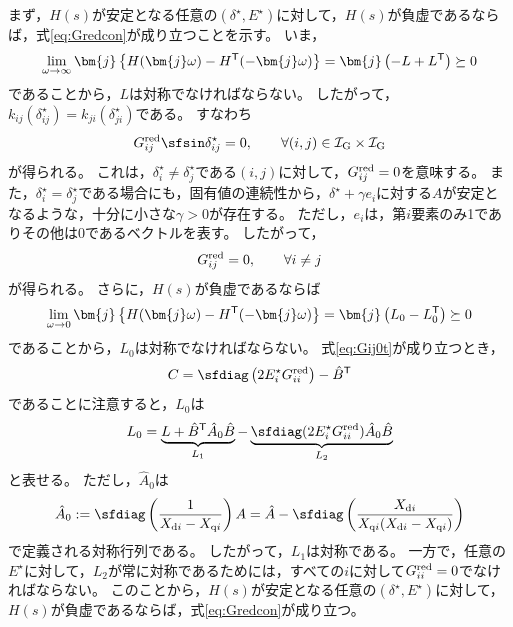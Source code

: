 \documentclass[tombow,dvipdfmx]{corona-a5}
\begin{document}
\begin{証明}
まず，$H(s)$が安定となる任意の$(\delta^{\star},E^{\star})$に対して，$H(s)$が負虚であるならば，式\ref{eq:Gredcon}が成り立つことを示す。
いま，
\[
\lim_{\omega \rightarrow \infty} \bm{j}
\left\{
H(\bm{j}\omega)-H^{\sf T}(-\bm{j}\omega)
\right\}
=\bm{j}
\left(
-L+L^{\sf T}
\right) \succeq 0
\]
であることから，$L$は対称でなければならない。
したがって，$k_{ij}(\delta_{ij}^{\star}) = k_{ji}(\delta_{ji}^{\star})$である。
すなわち
\[
G^{\rm red}_{ij} \sfsin \delta_{ij}^{\star} = 0 ,\qquad
\forall (i, j) \in \mathcal{I}_{\rm G} \times \mathcal{I}_{\rm G}
\]
が得られる。
これは，$\delta_{i}^{\star}\neq \delta_{j}^{\star}$である$(i,j)$に対して，$G^{\rm red}_{ij}=0$を意味する。
また，$\delta_{i}^{\star}= \delta_{j}^{\star}$である場合にも，固有値の連続性から，$\delta^{\star}+\gamma e_i$に対する$A$が安定となるような，十分に小さな$\gamma>0$が存在する。
ただし，$e_i$は，第$i$要素のみ1でありその他は0であるベクトルを表す。
したがって，
\begin{align}\label{eq:Gij0t}
G^{\rm red}_{ij}=0, \qquad
\forall i\neq j
\end{align}
が得られる。
さらに，$H(s)$が負虚であるならば
\[
\lim_{\omega \rightarrow 0} \bm{j}
\left\{
H(\bm{j}\omega)-H^{\sf T}(-\bm{j}\omega)
\right\}
=\bm{j}
\left(
L_0-L_0^{\sf T}
\right) \succeq 0
\]
であることから，$L_0$は対称でなければならない。
式\ref{eq:Gij0t}が成り立つとき，
\[
C = \sfdiag \left(
2E_i^{\star} G^{\rm red}_{ii}
\right)  - \hat{B}^{\sf T}
\]
であることに注意すると，$L_0$は
\[
L_0 = \underbrace{ L + \hat{B}^{\sf T} \hat{A}_0 \hat{B} }_{L_1}
-
\underbrace{ \sfdiag (
2 E_i^{\star} G^{\rm red}_{ii}
) \hat{A}_0 \hat{B}
}_{L_2}
\]
と表せる。
ただし，$\hat{A}_0$は
\begin{align}\label{eq:hatA0}
\hat{A}_0:= \sfdiag \left(
\frac{1} { X_{{\rm d}i}-X_{{\rm q}i} }
\right) A =
\hat{A}- \sfdiag \left(
\frac{X_{{\rm d}i}}{X_{{\rm q}i}(X_{{\rm d}i}-X_{{\rm q}i})}
\right)
\end{align}
で定義される対称行列である。
したがって，$L_1$は対称である。
一方で，任意の$E^{\star}$に対して，$L_2$が常に対称であるためには，すべての$i$に対して$G^{\rm red}_{ii}=0$でなければならない。
このことから，$H(s)$が安定となる任意の$(\delta^{\star},E^{\star})$に対して，$H(s)$が負虚であるならば，式\ref{eq:Gredcon}が成り立つ。



\end{証明}
\end{document}
